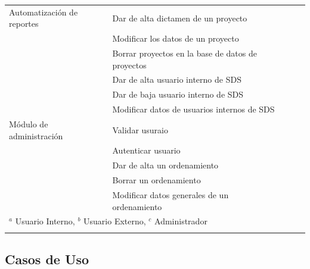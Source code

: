 \begin{longtable}{p{4cm} p{7cm} p{.5cm} p{.5cm} p{.5cm}}
Automatización de reportes & Dar de alta dictamen de un proyecto &\cellcolor{myotroazul} & & \cellcolor{myotroazul} \\

  & Modificar los datos de un proyecto & \cellcolor{myotroazul}& &  \cellcolor{myotroazul}\\

 & Borrar proyectos en la base de datos de proyectos &\cellcolor{myotroazul} & & \cellcolor{myotroazul}\\
\hline
 & Dar de alta usuario interno de SDS & & &  \cellcolor{myotroazul}\\

 & Dar de baja usuario interno de SDS  &  & & \cellcolor{myotroazul}\\

 & Modificar datos de usuarios internos de SDS & & & \cellcolor{myotroazul}\\

Módulo de administración & Validar usuraio &  & & \cellcolor{myotroazul}\\

 & Autenticar usuario & & & \cellcolor{myotroazul}\\

 & Dar de alta un ordenamiento & & & \cellcolor{myotroazul}\\

 & Borrar un ordenamiento & & & \cellcolor{myotroazul}\\

 & Modificar datos generales de un ordenamiento & & & \cellcolor{myotroazul}\\
\hline
\multicolumn{5}{l}{\small{$^a$ Usuario Interno, $^b$ Usuario Externo, $^c$ Administrador}}\\

  \\
\end{longtable}
\endgroup
\pagebreak
\subsection{Casos de Uso}






